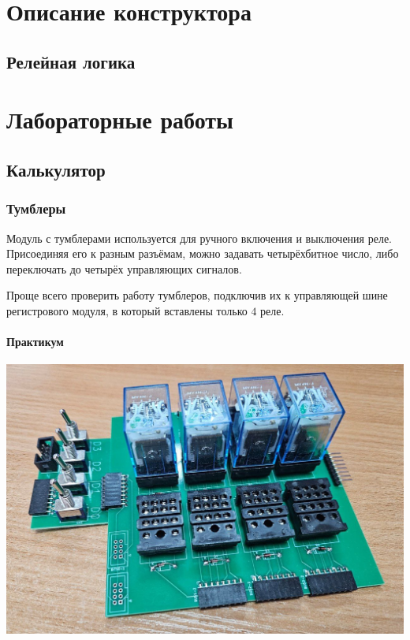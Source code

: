 \documentclass{book}
\begin{document}
\tableofcontents

\part{Описание конструктора}

\chapter{Релейная логика}

\part{Лабораторные работы}

\chapter{Калькулятор}

\section{Тумблеры}

Модуль с тумблерами используется для ручного включения и выключения реле.
Присоединяя его к разным разъёмам, можно задавать четырёхбитное число,
либо переключать до четырёх управляющих сигналов.

Проще всего проверить работу тумблеров, подключив их к управляющей шине
регистрового модуля, в который вставлены только $4$ реле.

\subsection{Практикум}

\includegraphics[width=\columnwidth]{photo/switches.jpg}
\end{document}
